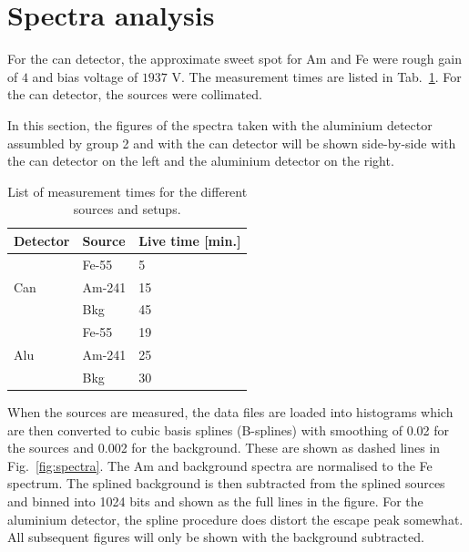 \section{Spectra analysis}
\label{sec:spectraanalysis}
For the can detector, the approximate sweet spot for Am and Fe were rough gain of $4$ and bias voltage of $1937$ V. The measurement times are listed in Tab.~\ref{tab:measurementstimes}. For the can detector, the sources were collimated.

In this section, the figures of the spectra taken with the aluminium detector assumbled by group 2 and with the can detector will be shown side-by-side with the can detector on the left and the aluminium detector on the right.

\begin{table}[htb]
  \centering
\begin{tabular}{lll}
\textbf{Detector}    & \textbf{Source} & \textbf{Live time {[}min.{]}} \\ \hline
\multirow{3}{*}{Can} & Fe-55           & 5                          \\
                     & Am-241          & 15                         \\
                     & Bkg             & 45                         \\ \hline
\multirow{3}{*}{Alu} & Fe-55           & 19                         \\
                     & Am-241          & 25                         \\
                     & Bkg             & 30                         \\ \hline
\end{tabular}
\caption{List of measurement times for the different sources and setups.}
\label{tab:measurementstimes}
\end{table}

When the sources are measured, the data files are loaded into histograms which are then converted to cubic basis splines (B-splines) with smoothing of 0.02 for the sources and 0.002 for the background. These are shown as dashed lines in Fig.~\ref{fig:spectra}. The Am and background spectra are normalised to the Fe spectrum. The splined background is then subtracted from the splined sources and binned into 1024 bits and shown as the full lines in the figure. For the aluminium detector, the spline procedure does distort the escape peak somewhat. All subsequent figures will only be shown with the background subtracted.

